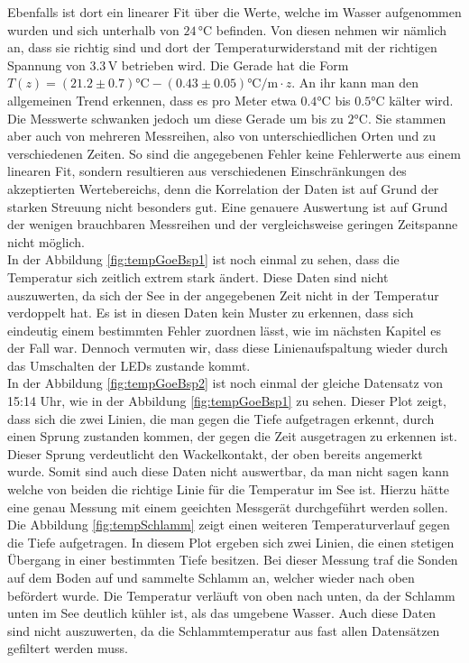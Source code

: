 \documentclass[12pt,a4paper,titlepage,headinclude,bibtotoc]{scrartcl}
\numberwithin{equation}{subsection}
\begin{document}
Ebenfalls ist dort ein linearer Fit über die Werte, welche im Wasser aufgenommen wurden und sich unterhalb von $24\,\si{\celsius}$ befinden.
Von diesen nehmen wir nämlich an, dass sie richtig sind und dort der Temperaturwiderstand mit der richtigen Spannung von $3.3\,$V betrieben wird.
Die Gerade hat die Form $T(z)=(21.2\pm 0.7)\si{\celsius}-(0.43\pm 0.05)\si{\celsius\per\meter}\cdot z$.
An ihr kann man den allgemeinen Trend erkennen, dass es pro Meter etwa $0.4\si{\celsius}$ bis  $0.5\si{\celsius}$  kälter wird.
Die Messwerte schwanken jedoch um diese Gerade um bis zu $2\si{\celsius}$.
Sie stammen aber auch von mehreren Messreihen, also von unterschiedlichen Orten und zu verschiedenen Zeiten.
So sind die angegebenen Fehler keine Fehlerwerte aus einem linearen Fit, sondern resultieren aus verschiedenen Einschränkungen des akzeptierten Wertebereichs, denn die Korrelation der Daten ist auf Grund der starken Streuung nicht besonders gut.
Eine genauere Auswertung ist auf Grund der wenigen brauchbaren Messreihen und der vergleichsweise geringen Zeitspanne nicht möglich.\\
In der Abbildung \ref{fig:tempGoeBsp1} ist noch einmal zu sehen, dass die Temperatur sich zeitlich extrem stark ändert.
Diese Daten sind nicht auszuwerten, da sich der See in der angegebenen Zeit nicht in der Temperatur verdoppelt hat.
Es ist in diesen Daten kein Muster zu erkennen, dass sich eindeutig einem bestimmten Fehler zuordnen lässt, wie im nächsten Kapitel es der Fall war.
Dennoch vermuten wir, dass diese Linienaufspaltung wieder durch das Umschalten der LEDs zustande kommt.\\
In der Abbildung \ref{fig:tempGoeBsp2} ist noch einmal der gleiche Datensatz von 15:14 Uhr, wie in der Abbildung \ref{fig:tempGoeBsp1} zu sehen.
Dieser Plot zeigt, dass sich die zwei Linien, die man gegen die Tiefe aufgetragen erkennt, durch einen Sprung zustanden kommen, der gegen die Zeit ausgetragen zu erkennen ist.
Dieser Sprung verdeutlicht den Wackelkontakt, der oben bereits angemerkt wurde.
Somit sind auch diese Daten nicht auswertbar, da man nicht sagen kann welche von beiden die richtige Linie für die Temperatur im See ist.
Hierzu hätte eine genau Messung mit einem geeichten Messgerät durchgeführt werden sollen.\\
Die Abbildung \ref{fig:tempSchlamm} zeigt einen weiteren Temperaturverlauf gegen die Tiefe aufgetragen.
In diesem Plot ergeben sich zwei Linien, die einen stetigen Übergang in einer bestimmten Tiefe besitzen.
Bei dieser Messung traf die Sonden auf dem Boden auf und sammelte Schlamm an, welcher wieder nach oben befördert wurde.
Die Temperatur verläuft von oben nach unten, da der Schlamm unten im See deutlich kühler ist, als das umgebene Wasser.
Auch diese Daten sind nicht auszuwerten, da die Schlammtemperatur aus fast allen Datensätzen gefiltert werden muss.
\end{document}

